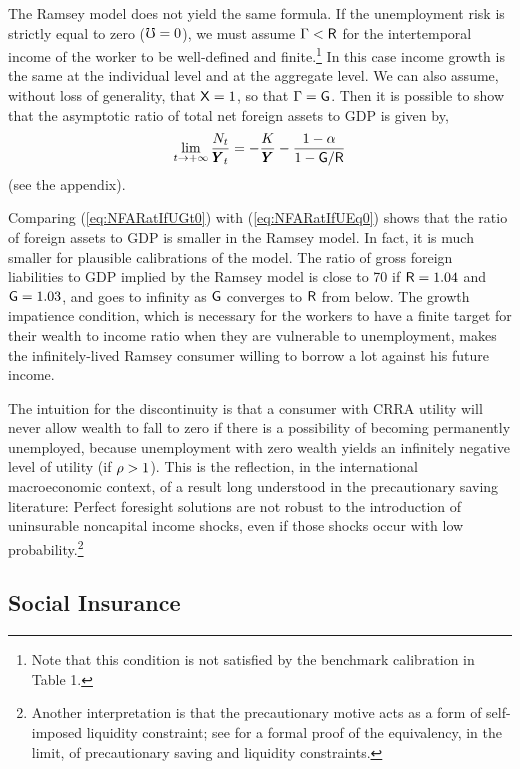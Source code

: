 \documentclass[titlepage,abstract,letterpaper]{econtex}
\renewcommand{\GDPLev}{\ensuremath{\pmb{Y}}}
\begin{document}
The Ramsey model does not yield the same formula. If the unemployment risk is strictly equal to zero ($\mho=0$), we must assume $\Gamma < \mathsf{R}$ for the intertemporal income of the worker to be well-defined and finite.\footnote{Note that this condition is not satisfied by the benchmark calibration in Table 1.} In this case income growth is the same at the individual level and at the aggregate level. We can also assume, without loss of generality, that $\mathsf{X}=1$, so that $\Gamma=\mathsf{G}$. Then it is possible to show that the asymptotic ratio of total net foreign assets to GDP is given by,
\begin{equation}
\lim_{t \rightarrow +\infty} \frac{\NFALev_t}{\GDPLev_t}=-\frac{\KLev}{\GDPLev}-\frac{1-\kapShare}{1-\WGro/\Rfree}
\label{eq:NFARatIfUEq0}
\end{equation}
(see the appendix).

Comparing (\ref{eq:NFARatIfUGt0}) with (\ref{eq:NFARatIfUEq0}) shows that the ratio of foreign assets to GDP is smaller in the Ramsey model. In fact, it is much smaller for plausible calibrations of the model. The ratio of gross foreign liabilities to GDP implied by the Ramsey model is close to 70 if $\mathsf{R} =1.04$ and $\mathsf{G} =1.03$, and goes to infinity as $\mathsf{G}$ converges to $\mathsf{R}$ from below. The growth impatience condition, which is necessary for the workers to have a finite target for their wealth to income ratio when they are vulnerable to unemployment, makes the infinitely-lived Ramsey consumer willing to borrow a lot against his future income.

The intuition for the discontinuity is that a consumer with CRRA
utility will never allow wealth to fall to zero if there is a
possibility of becoming permanently unemployed, because unemployment
with zero wealth yields an infinitely negative level of utility (if
$\rho>1$).  This is the reflection, in the international
macroeconomic context, of a result long understood in the
precautionary saving literature: Perfect foresight solutions are not
robust to the introduction of uninsurable noncapital income
shocks, even if those shocks occur with low probability.\footnote{Another interpretation is that the precautionary motive acts as a form of self-imposed liquidity constraint; see \cite{BufferStockTheory} for a formal proof of the equivalency, in the limit, of precautionary saving and liquidity constraints.}

\subsection{Social Insurance}
\end{document}
